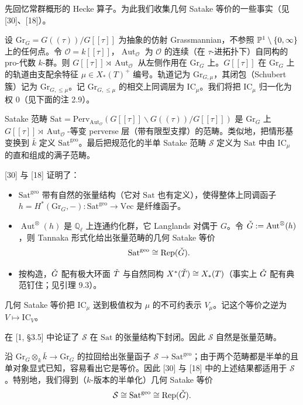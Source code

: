 先回忆常群概形的 Hecke 算子。为此我们收集几何 Satake 等价的一些事实（见 [30]、[18]）。

设 $\mathrm{Gr}_G=G((\tau))/G[[\tau]]$ 为抽象的仿射 Grassmannian，不参照 $\mathbb{P}^1\setminus\{0,\infty\}$ 上的任何点。令 $\mathcal O=k[[\tau]]$，$\operatorname{Aut}_{\mathcal O}$ 为 $\mathcal O$ 的连续（在 $\tau$-进拓扑下）自同构的 pro-代数 $k$-群。则 $G[[\tau]]\rtimes\operatorname{Aut}_{\mathcal O}$ 从左侧作用在 $\mathrm{Gr}_G$ 上。$G[[\tau]]$ 在 $\mathrm{Gr}_G$ 上的轨道由支配余特征 $\mu\in X_*(T)^+$ 编号。轨道记为 $\mathrm{Gr}_{G,\mu}$，其闭包（Schubert 簇）记为 $\mathrm{Gr}_{G,\le\mu}$。记 $\mathrm{Gr}_{G,\le\mu}$ 的相交上同调层为 $\mathrm{IC}_\mu$。我们将把 $\mathrm{IC}_\mu$ 归一化为权 $0$（见下面的注 2.9）。

Satake 范畴 $\mathrm{Sat}=\mathrm{Perv}_{\operatorname{Aut}_{\mathcal O}}(G[[\tau]]\backslash G((\tau))/G[[\tau]])$ 是 $\mathrm{Gr}_G$ 上 $G[[\tau]]\rtimes\operatorname{Aut}_{\mathcal O}$-等变 perverse 层（带有限型支撑）的范畴。类似地，把情形基变换到 $\bar k$ 定义 $\mathrm{Sat}^{\mathrm{geo}}$。最后把规范化的半单 Satake 范畴 $\mathcal S$ 定义为 $\mathrm{Sat}$ 中由 $\mathrm{IC}_\mu$ 的直和组成的满子范畴。

[30] 与 [18] 证明了：
\begin{itemize}[leftmargin=1.6em, itemsep=.2em]
\item $\mathrm{Sat}^{\mathrm{geo}}$ 带有自然的张量结构（它对 $\mathrm{Sat}$ 也有定义），使得整体上同调函子 $h=H^*(\mathrm{Gr}_G,-):\mathrm{Sat}^{\mathrm{geo}}\to\mathrm{Vec}$ 是纤维函子。
\item $\operatorname{Aut}^\otimes(h)$ 是 $\mathbb{Q}_\ell$ 上连通约化群，它 Langlands 对偶于 $G$。令 $\check G:=\operatorname{Aut}^\otimes(h)$，则 Tannaka 形式化给出张量范畴的几何 Satake 等价
\[
\mathrm{Sat}^{\mathrm{geo}}\cong\mathrm{Rep}(\check G).
\]
\item 按构造，$\check G$ 配有极大环面 $\check T$ 与自然同构 $X^*(\check T)\cong X_*(T)$（事实上 $\check G$ 配有典范钉住；见引理 9.3）。
\end{itemize}

几何 Satake 等价把 $\mathrm{IC}_\mu$ 送到极值权为 $\mu$ 的不可约表示 $V_\mu$。记这个等价之逆为 $V\mapsto\mathrm{IC}_V$。

\begin{remark}
在 [1, §3.5] 中论证了 $\mathcal S$ 在 $\mathrm{Sat}$ 的张量结构下封闭。因此 $\mathcal S$ 自然是张量范畴。

沿 $\mathrm{Gr}_G\otimes_k\bar k\to\mathrm{Gr}_G$ 的拉回给出张量函子 $\mathcal S\to\mathrm{Sat}^{\mathrm{geo}}$；由于两个范畴都是半单的且单对象显式已知，容易看出它是等价。因此 [30] 与 [18] 中的上述结果都适用于 $\mathcal S$。特别地，我们得到（$k$-版本的半单化）几何 Satake 等价
\[
\mathcal S\cong\mathrm{Sat}^{\mathrm{geo}}\cong\mathrm{Rep}(\check G).
\]
\end{remark}

